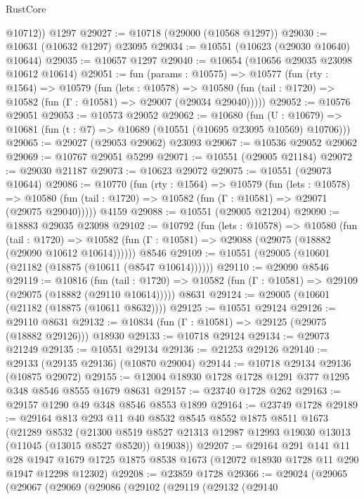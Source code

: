 \begin{lexlean}{RustCore}
\begin{coremodule}
        @10712))
    @1297
@29027 := @10718 (@29000 (@10568 @1297))
@29030 := @10631 (@10632 @1297) @23095
@29034 := @10551 (@10623 (@29030 @10640) @10644)
@29035 := @10657 @1297
@29040 := @10654 (@10656 @29035 @23098 @10612 @10614)
@29051 := fun (params : @10575) =>
  @10577
    (fun (rty : @1564) =>
    @10579
      (fun (lets : @10578) =>
      @10580 (fun (tail : @1720) => @10582 (fun (Γ : @10581) => @29007 (@29034 @29040)))))
@29052 := @10576 @29051
@29053 := @10573 @29052
@29062 := @10680
    (fun (U : @10679) => @10681 (fun (t : @7) => @10689 (@10551 (@10695 @23095 @10569) @10706)))
@29065 := @29027 (@29053 @29062) @23093
@29067 := @10536 @29052 @29062
@29069 := @10767 @29051 @5299
@29071 := @10551 (@29005 @21184)
@29072 := @29030 @21187
@29073 := @10623 @29072
@29075 := @10551 (@29073 @10644)
@29086 := @10770
    (fun (rty : @1564) =>
    @10579
      (fun (lets : @10578) =>
      @10580 (fun (tail : @1720) => @10582 (fun (Γ : @10581) => @29071 (@29075 @29040)))))
    @4159
@29088 := @10551 (@29005 @21204)
@29090 := @18883 @29035 @23098
@29102 := @10792
    (fun (lets : @10578) =>
    @10580
      (fun (tail : @1720) =>
      @10582 (fun (Γ : @10581) => @29088 (@29075 (@18882 (@29090 @10612 @10614))))))
    @8546
@29109 := @10551 (@29005 (@10601 (@21182 (@18875 (@10611 (@8547 @10614))))))
@29110 := @29090 @8546
@29119 := @10816
    (fun (tail : @1720) => @10582 (fun (Γ : @10581) => @29109 (@29075 (@18882 (@29110 @10614)))))
    @8631
@29124 := @29005 (@10601 (@21182 (@18875 (@10611 @8632))))
@29125 := @10551 @29124
@29126 := @29110 @8631
@29132 := @10834 (fun (Γ : @10581) => @29125 (@29075 (@18882 @29126))) @18930
@29133 := @10718 @29124
@29134 := @29073 @21249
@29135 := @10551 @29134
@29136 := @21253 @29126
@29140 := @29133 (@29135 @29136) (@10870 @29004)
@29144 := @10718 @29134 @29136 (@10875 @29072)
@29155 := @12004 @18930 @1728 @1728 @1291 @377 @1295 @348 @8546 @8555 @1679 @8631
@29157 := @23740 @1728 @262
@29163 := @29157 @1290 @49 @348 @8546 @8553 @1899
@29164 := @23749 @1728
@29189 := @29164
    @813
    @293
    @11
    @40
    @8532
    @8545
    @8552
    @1875
    @8511
    @1673
    (@21289
      @8532
      (@21300 @8519 @8527 @21313 @12987 @12993 @19030 @13013 (@11045 (@13015 @8527 @8520)) @19038))
@29207 := @29164
    @291
    @141
    @11
    @28
    @1947
    @1679
    @1725
    @1875
    @8538
    @1673
    (@12072 @18930 @1728 @11 @290 @1947 @12298 @12302)
@29208 := @23859 @1728
@29366 := @29024
    (@29065
      (@29067
        (@29069
          (@29086
            (@29102
              (@29119
                (@29132
                  (@29140

\end{coremodule}
\end{lexlean}
